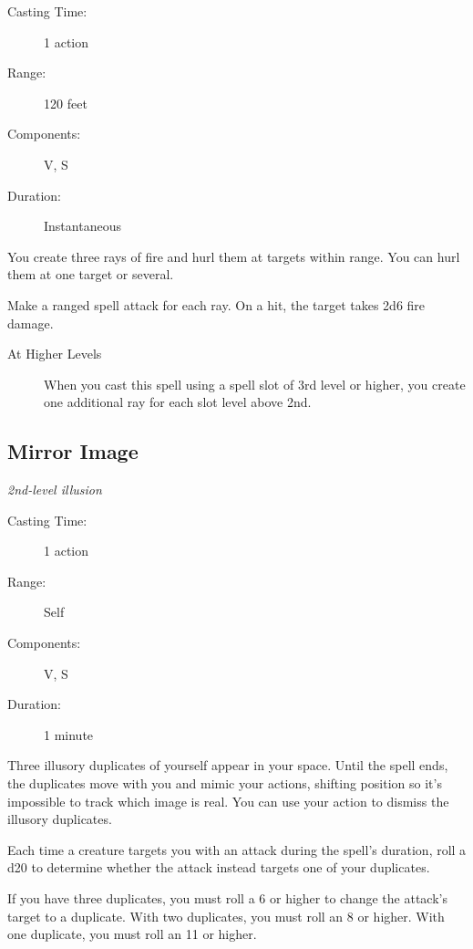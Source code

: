 \documentclass[letterpaper,10pt,twoside,twocolumn,openany]{book}
\begin{document}
\begin{description}
	\item[Casting Time:] 1 action
	\item[Range:] 120 feet 
	\item[Components:] V, S
	\item[Duration:] Instantaneous
\end{description}

You create three rays of fire and hurl them at targets within range. You can hurl them at one target or several.

Make a ranged spell attack for each ray. On a hit, the target takes 2d6 fire damage. 

\begin{description}
	\item[At Higher Levels] When you cast this spell using a spell slot of 3rd level or higher, you create one additional ray for each slot level above 2nd. 
\end{description}

\subsection{Mirror Image} \hypertarget{Mirror Image}{}
\begin{hangingpar}
	\textit{2nd-level illusion}
\end{hangingpar}

\begin{description}
	\item[Casting Time:] 1 action
	\item[Range:] Self 
	\item[Components:] V, S
	\item[Duration:] 1 minute
\end{description}

Three illusory duplicates of yourself appear in your space. Until the spell ends, the duplicates move with you and mimic your actions, shifting position so it's impossible to track which image is real. You can use your action to dismiss the illusory duplicates.

Each time a creature targets you with an attack during the spell's duration, roll a d20 to determine whether the attack instead targets one of your duplicates.

If you have three duplicates, you must roll a 6 or higher to change the attack's target to a duplicate. With two duplicates, you must roll an 8 or higher. With one duplicate, you must roll an 11 or higher.
\end{document}
